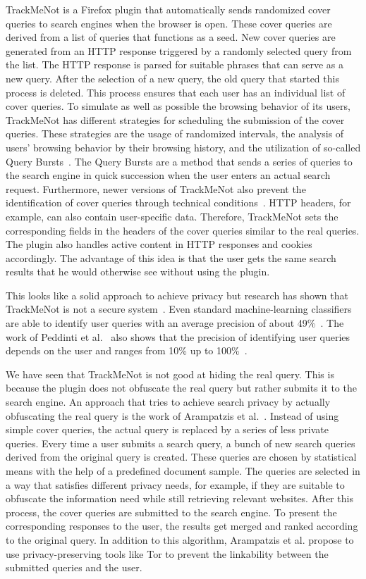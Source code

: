 TrackMeNot is a Firefox plugin that automatically sends randomized cover queries to search engines when the browser is open. These cover queries are derived from a list of queries that functions as a seed. New cover queries are generated from an HTTP response triggered by a randomly selected query from the list. The HTTP response is parsed for suitable phrases that can serve as a new query. After the selection of a new query, the old query that started this process is deleted. This process ensures that each user has an individual list of cover queries. To simulate as well as possible the browsing behavior of its users, TrackMeNot has different strategies for scheduling the submission of the cover queries. These strategies are the usage of randomized intervals, the analysis of users' browsing behavior by their browsing history, and the utilization of so-called Query Bursts~\cite{trackmenot1}. The Query Bursts are a method that sends a series of queries to the search engine in quick succession when the user enters an actual search request. Furthermore, newer versions of TrackMeNot also prevent the identification of cover queries through technical conditions~\cite{trackmenot1}. HTTP headers, for example, can also contain user-specific data. Therefore, TrackMeNot sets the corresponding fields in the headers of the cover queries similar to the real queries. The plugin also handles active content in HTTP responses and cookies accordingly. The advantage of this idea is that the user gets the same search results that he would otherwise see without using the plugin.\par
This looks like a solid approach to achieve privacy but research has shown that TrackMeNot is not a secure system~\cite{trackmenotsogood, trackmenotWeakness}. Even standard machine-learning classifiers are able to identify user queries with an average precision of about 49\%~\cite{trackmenotWeakness}. The work of Peddinti et al.~\cite{trackmenotWeakness} also shows that the precision of identifying user queries depends on the user and ranges from 10\% up to 100\%~\cite{trackmenotWeakness}.\par
We have seen that TrackMeNot is not good at hiding the real query. This is because the plugin does not obfuscate the real query but rather submits it to the search engine. An approach that tries to achieve search privacy by actually obfuscating the real query is the work of Arampatzis et al.~\cite{arampatzis}. Instead of using simple cover queries, the actual query is replaced by a series of less private queries. Every time a user submits a search query, a bunch of new search queries derived from the original query is created. These queries are chosen by statistical means with the help of a predefined document sample. The queries are selected in a way that satisfies different privacy needs, for example, if they are suitable to obfuscate the information need while still retrieving relevant websites. After this process, the cover queries are submitted to the search engine. To present the corresponding responses to the user, the results get merged and ranked according to the original query. In addition to this algorithm, Arampatzis et al. propose to use privacy-preserving tools like Tor to prevent the linkability between the submitted queries and the user.\par

